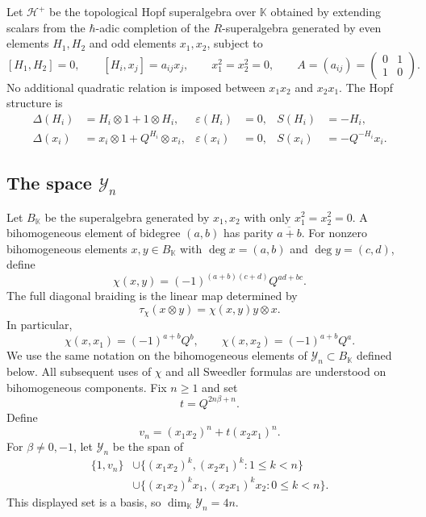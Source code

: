 \documentclass[11pt,a4paper]{article}
\newcommand{\hK}{\mathbb K}
\newcommand{\ot}{\otimes}
\theoremstyle{definition}
\theoremstyle{remark}
\begin{document}
Let \(\mathcal H^+\) be the topological Hopf superalgebra over
\(\hK\) obtained by extending scalars from the \(\hbar\)-adic
completion of the \(R\)-superalgebra generated by even elements
\(H_1,H_2\) and odd elements \(x_1,x_2\), subject to
\begin{equation}\label{eq:positive-relations}
 [H_1,H_2]=0,\qquad
 [H_i,x_j]=a_{ij}x_j,\qquad x_1^2=x_2^2=0,
 \qquad
 A=(a_{ij})=\begin{pmatrix}0&1\\1&0\end{pmatrix}.
\end{equation}
No additional quadratic relation is imposed between \(x_1x_2\) and
\(x_2x_1\).  The Hopf structure is
\begin{equation}\label{eq:positive-Hopf}
\begin{aligned}
 \Delta(H_i)&=H_i\ot1+1\ot H_i,
 &\varepsilon(H_i)&=0,
 &S(H_i)&=-H_i,\\
 \Delta(x_i)&=x_i\ot1+Q^{H_i}\ot x_i,
 &\varepsilon(x_i)&=0,
 &S(x_i)&=-Q^{-H_i}x_i.
\end{aligned}
\end{equation}
\subsection[The space Yn]{The space \(\mathcal Y_n\)}

Let \(B_{\hK}\) be the superalgebra generated by \(x_1,x_2\) with only
\(x_1^2=x_2^2=0\).  A bihomogeneous element of bidegree \((a,b)\) has parity
\(\overline{a+b}\).  For nonzero bihomogeneous elements
\(x,y\in B_{\hK}\) with \(\deg x=(a,b)\) and \(\deg y=(c,d)\), define
\begin{equation}\label{eq:chi}
 \chi(x,y)=(-1)^{(a+b)(c+d)}Q^{ad+bc}.
\end{equation}
The full diagonal braiding is the linear map determined by
\[
 \tau_\chi(x\ot y)=\chi(x,y)y\ot x.
\]
In particular,
\[
 \chi(x,x_1)=(-1)^{a+b}Q^b,\qquad
 \chi(x,x_2)=(-1)^{a+b}Q^a.
\]
We use the same notation on the bihomogeneous elements of
\(\mathcal Y_n\subset B_{\hK}\) defined below.  All subsequent uses of
\(\chi\) and all Sweedler formulas are understood on bihomogeneous
components.
Fix \(n\geq1\) and set
\begin{equation}\label{eq:parameters}
 t=Q^{2n\beta+n}.
\end{equation}
Define
\[
 v_n=(x_1x_2)^n+t(x_2x_1)^n.
\]
For \(\beta\neq0,-1\), let \(\mathcal Y_n\) be the span of
\begin{equation}\label{eq:Yn-basis}
\begin{split}
 \{1,v_n\}
 &\cup\{(x_1x_2)^k,(x_2x_1)^k:1\leq k<n\}\\
 &\cup\{(x_1x_2)^kx_1,(x_2x_1)^kx_2:0\leq k<n\}.
\end{split}
\end{equation}
This displayed set is a basis, so \(\dim_{\hK}\mathcal Y_n=4n\).
\end{document}

